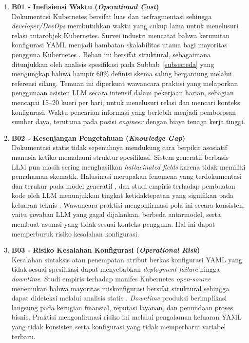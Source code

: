 \begin{enumerate}
    \item \textbf{B01 - Inefisiensi Waktu (\textit{Operational Cost})} \\
    Dokumentasi Kubernetes bersifat luas dan terfragmentasi sehingga \textit{developer/DevOps} membutuhkan waktu yang cukup lama untuk menelusuri relasi antarobjek Kubernetes. Survei industri mencatat bahwa kerumitan konfigurasi YAML menjadi hambatan skalabilitas utama bagi mayoritas pengguna Kubernetes \parencite{cncf_2023_survey}. Beban ini bersifat struktural, sebagaimana ditunjukkan oleh analisis spesifikasi pada Subbab~\ref{subsec:eda} yang mengungkap bahwa hampir 60\% definisi skema saling bergantung melalui referensi silang. Temuan ini diperkuat wawancara praktisi yang melaporkan penggunaan asisten LLM secara intensif dalam pekerjaan harian, sebagian mencapai 15--20 kueri per hari, untuk menelusuri relasi dan mencari konteks konfigurasi. Waktu pencarian informasi yang berlebih menjadi pemborosan sumber daya, terutama pada posisi \textit{engineer} dengan biaya tenaga kerja tinggi.

    \item \textbf{B02 - Kesenjangan Pengetahuan (\textit{Knowledge Gap})} \\
    Dokumentasi statis tidak sepenuhnya mendukung cara berpikir asosiatif manusia ketika memahami struktur spesifikasi. Sistem generatif berbasis LLM pun masih sering menghasilkan \textit{hallucinated fields} karena tidak memiliki pemahaman skematik. Halusinasi merupakan fenomena yang terdokumentasi dan terukur pada model generatif \parencite{ji_hallucination_2023}, dan studi empiris terhadap pembuatan kode oleh LLM menunjukkan tingkat ketidaktepatan yang signifikan pada keluaran teknis \parencite{liu2024deepanalysis}. Wawancara praktisi mengonfirmasi pola ini secara konsisten, yaitu jawaban LLM yang gagal dijalankan, berbeda antarmodel, serta membuat asumsi yang tidak sesuai konteks pengguna. Hal ini dapat memperburuk risiko kesalahan konfigurasi.

    \item \textbf{B03 - Risiko Kesalahan Konfigurasi (\textit{Operational Risk})} \\
    Kesalahan sintaksis atau penempatan atribut berkas konfigurasi YAML yang tidak sesuai spesifikasi dapat menyebabkan \textit{deployment failure} hingga \textit{downtime}. Studi empiris terhadap manifes Kubernetes \textit{open-source} menemukan bahwa mayoritas miskonfigurasi bersifat struktural sehingga dapat dideteksi melalui analisis statis \parencite{rahman2023misconfigurations}. \textit{Downtime} produksi berimplikasi langsung pada kerugian finansial, reputasi layanan, dan penundaan proses bisnis. Praktisi mengonfirmasi risiko ini melalui pengalaman keluaran YAML yang tidak konsisten serta konfigurasi yang tidak memperbarui variabel terbaru.

\end{enumerate}

